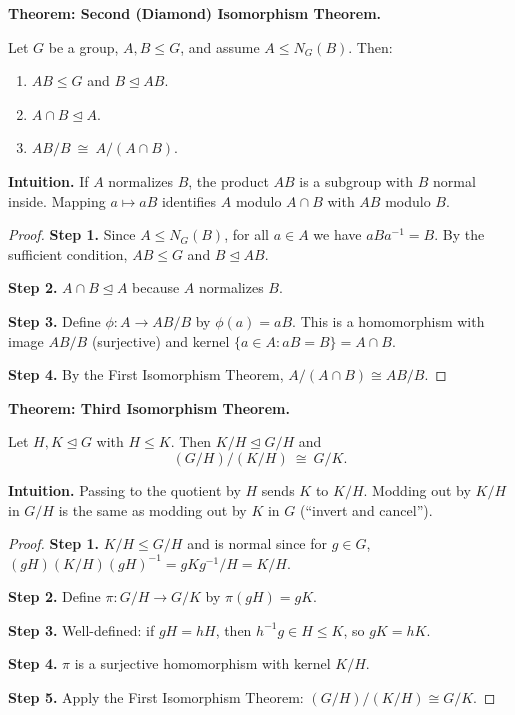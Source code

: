 \documentclass[9pt]{article}
\theoremstyle{definition}
\begin{document}
\newpage


\noindent\textbf{Theorem: Second (Diamond) Isomorphism Theorem.}

\newpage

Let $G$ be a group, $A,B\le G$, and assume $A\le N_G(B)$. Then:
\begin{enumerate}
  \item $AB\le G$ and $B\trianglelefteq AB$.
  \item $A\cap B\trianglelefteq A$.
  \item $AB/B\ \cong\ A/(A\cap B)$.
\end{enumerate}

\dotfill

\noindent\textbf{Intuition.}
If $A$ normalizes $B$, the product $AB$ is a subgroup with $B$ normal inside. Mapping $a\mapsto aB$ identifies $A$ modulo $A\cap B$ with $AB$ modulo $B$.

\dotfill

\begin{proof}
\textbf{Step 1.} Since $A\le N_G(B)$, for all $a\in A$ we have $aBa^{-1}=B$. By the sufficient condition, $AB\le G$ and $B\trianglelefteq AB$.

\textbf{Step 2.} $A\cap B\trianglelefteq A$ because $A$ normalizes $B$.

\textbf{Step 3.} Define $\phi:A\to AB/B$ by $\phi(a)=aB$. This is a homomorphism with image $AB/B$ (surjective) and kernel $\{a\in A: aB=B\}=A\cap B$.

\textbf{Step 4.} By the First Isomorphism Theorem, $A/(A\cap B)\cong AB/B$.
\end{proof}

\newpage


\noindent\textbf{Theorem: Third Isomorphism Theorem.}

\newpage

Let $H,K\trianglelefteq G$ with $H\le K$. Then $K/H\trianglelefteq G/H$ and
\[
(G/H)/(K/H)\ \cong\ G/K.
\]

\dotfill

\noindent\textbf{Intuition.}
Passing to the quotient by $H$ sends $K$ to $K/H$. Modding out by $K/H$ in $G/H$ is the same as modding out by $K$ in $G$ (“invert and cancel”).

\dotfill

\begin{proof}
\textbf{Step 1.} $K/H\le G/H$ and is normal since for $g\in G$, $(gH)(K/H)(gH)^{-1}=gKg^{-1}/H=K/H$.

\textbf{Step 2.} Define $\pi:G/H\to G/K$ by $\pi(gH)=gK$.

\textbf{Step 3.} Well-defined: if $gH=hH$, then $h^{-1}g\in H\le K$, so $gK=hK$.

\textbf{Step 4.} $\pi$ is a surjective homomorphism with kernel $K/H$.

\textbf{Step 5.} Apply the First Isomorphism Theorem: $(G/H)/(K/H)\cong G/K$.
\end{proof}
\end{document}
